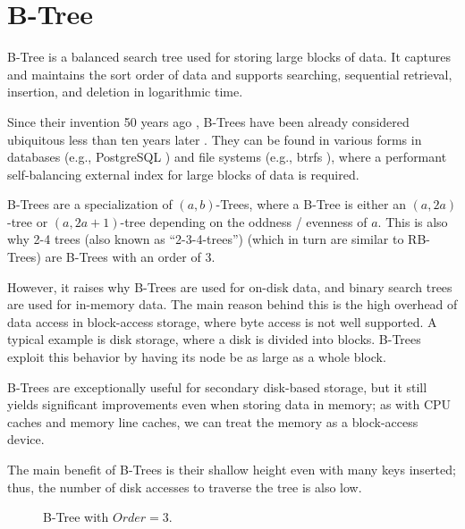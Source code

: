 \section{B-Tree}\label{section:b-tree}

B-Tree is a balanced search tree used for storing large blocks of data. It captures and maintains the sort order of data and supports searching, sequential retrieval, insertion, and deletion in logarithmic time.

Since their invention 50 years ago \cite{bayer-org}, B-Trees have been already considered ubiquitous less than ten years later \cite{10.1145/356770.356776}. They can be found in various forms in databases (e.g., PostgreSQL \cite{postgresql}) and file systems (e.g., btrfs \cite{btrfs}), where a performant self-balancing external index for large blocks of data is required. 

B-Trees are a specialization of $(a,b)$-Trees, where a B-Tree is either an $(a, 2a)$-tree or $(a, 2a + 1)$-tree depending on the oddness / evenness of $a$. This is also why 2-4 trees (also known as \enquote{2-3-4-trees}) (which in turn are similar to RB-Trees) are B-Trees with an order of 3.

However, it raises why B-Trees are used for on-disk data, and binary search trees are used for in-memory data. The main reason behind this is the high overhead of data access in block-access storage, where byte access is not well supported. A typical example is disk storage, where a disk is divided into blocks. B-Trees exploit this behavior by having its node be as large as a whole block.

B-Trees are exceptionally useful for secondary disk-based storage, but it still yields significant improvements even when storing data in memory; as with CPU caches and memory line caches, we can treat the memory as a block-access device.

The main benefit of B-Trees is their shallow height even with many keys inserted; thus, the number of disk accesses to traverse the tree is also low.

\begin{figure}[H]
  \centering
  
  \caption{B-Tree with $\mathit{Order} = 3$.}
\end{figure}

